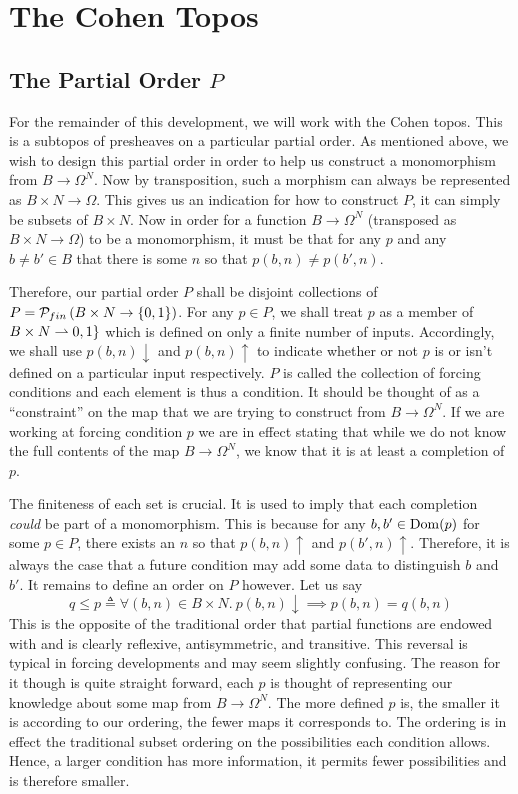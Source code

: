 \section{The Cohen Topos}\label{sec:cohentopos}
\subsection{The Partial Order \texorpdfstring{$P$}{P}}\label{subsec:partialorder}\hfill

For the remainder of this development, we will work with the Cohen
topos. This is a subtopos of presheaves on a particular partial
order. As mentioned above, we wish to design this partial order in
order to help us construct a monomorphism from $B \to \Omega^N$. Now
by transposition, such a morphism can always be represented as
$B \times N \to \Omega$. This gives us an indication for how to
construct $P$, it can simply be subsets of $B \times N$. Now in order
for a function $B \to \Omega^N$ (transposed as
$B \times N \to \Omega$) to be a monomorphism, it must be that for any
$p$ and any $b \neq b' \in B$ that there is some $n$ so that
$p(b, n) \neq p(b', n)$.

Therefore, our partial order $P$ shall be disjoint collections of
$P = \powfin{B \times N \to \{0, 1\}}$. For any $p \in P$, we shall
treat $p$ as a member of $B \times N \pto \{0, 1\}$ which is defined
on only a finite number of inputs. Accordingly, we shall use
$p(b, n) \downarrow$ and $p(b, n)\uparrow$ to indicate whether or not
$p$ is or isn't defined on a particular input respectively. $P$ is
called the collection of forcing conditions and each element is thus a
condition. It should be thought of as a ``constraint'' on the map that
we are trying to construct from $B \to \Omega^N$. If we are working at
forcing condition $p$ we are in effect stating that while we do not
know the full contents of the map $B \to \Omega^N$, we know that it is
at least a completion of $p$.

The finiteness of each set is crucial. It is used to imply that each
completion \emph{could} be part of a monomorphism. This is because for
any $b, b' \in \dom(p)$ for some $p \in P$, there exists an $n$ so
that $p(b, n) \uparrow$ and $p(b', n) \uparrow$. Therefore, it is
always the case that a future condition may add some data to
distinguish $b$ and $b'$. It remains to define an order on $P$
however. Let us say
\[
  q \le p \triangleq \forall (b, n) \in B \times N.
  \ p(b, n) \downarrow \implies p(b, n) = q(b, n)
\]
This is the opposite of the traditional order that partial functions
are endowed with and is clearly reflexive, antisymmetric, and
transitive. This reversal is typical in forcing developments and may
seem slightly confusing. The reason for it though is quite straight
forward, each $p$ is thought of representing our knowledge about some
map from $B \to \Omega^N$. The more defined $p$ is, the smaller it is
according to our ordering, the fewer maps it corresponds to. The
ordering is in effect the traditional subset ordering on the
possibilities each condition allows. Hence, a larger condition has
more information, it permits fewer possibilities and is therefore
smaller.

